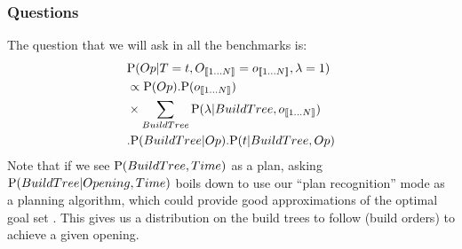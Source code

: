 \subsubsection{Questions}
The question that we will ask in all the benchmarks is:
\begin{eqnarray}
 & \mathrm{P}(Op|T=t, O_{\llbracket 1\dots N\rrbracket}=o_{\llbracket 1\dots N\rrbracket}, \lambda = 1) \\
 & \propto \mathrm{P}(Op).\mathrm{P}(o_{\llbracket 1\dots N\rrbracket})\\
 & \times \sum_{BuildTree} \mathrm{P}(\lambda | BuildTree, o_{\llbracket 1\dots N\rrbracket})\\
 & .\mathrm{P}(BuildTree|Op).\mathrm{P}(t|BuildTree, Op)
\end{eqnarray}
Note that if we see $\mathrm{P}(BuildTree, Time)$ as a plan, asking $\mathrm{P}(BuildTree|Opening, Time)$ boils down to use our ``plan recognition'' mode as a planning algorithm, which could provide good approximations of the optimal goal set \citep{Ramirez}. This gives us a distribution on the build trees to follow (build orders) to achieve a given opening.


